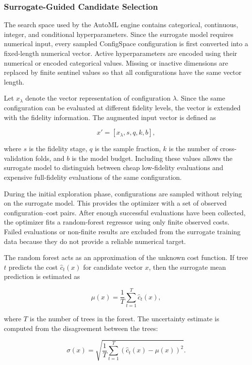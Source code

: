 \documentclass[12pt,a4paper]{report}
\begin{document}
\subsubsection{Surrogate-Guided Candidate Selection}

The search space used by the AutoML engine contains categorical,
continuous, integer, and conditional hyperparameters. Since the surrogate model
requires numerical input, every sampled ConfigSpace configuration is first
converted into a fixed-length numerical vector. Active hyperparameters are
encoded using their numerical or encoded categorical values. Missing or inactive
dimensions are replaced by finite sentinel values so that all configurations
have the same vector length.

\noindent Let \(x_{\lambda}\) denote the vector representation of configuration
\(\lambda\). Since the same configuration can be evaluated at different fidelity
levels, the vector is extended with the fidelity information. The augmented
input vector is defined as

\[
x' = [x_{\lambda}, s, q, k, b],
\]

\noindent where \(s\) is the fidelity stage, \(q\) is the sample fraction, \(k\) is the
number of cross-validation folds, and \(b\) is the model budget. Including these
values allows the surrogate model to distinguish between cheap low-fidelity
evaluations and expensive full-fidelity evaluations of the same configuration.

\noindent During the initial exploration phase, configurations are sampled without relying
on the surrogate model. This provides the optimizer with a set of observed
configuration--cost pairs. After enough successful evaluations have been
collected, the optimizer fits a random-forest regressor using only finite
observed costs. Failed evaluations or non-finite results are excluded from the
surrogate training data because they do not provide a reliable numerical target.

\noindent The random forest acts as an approximation of the unknown cost function. If
tree \(t\) predicts the cost \(\hat{c}_t(x)\) for candidate vector \(x\), then
the surrogate mean prediction is estimated as

\[
\mu(x) =
\frac{1}{T}
\sum_{t=1}^{T}
\hat{c}_t(x),
\]

\noindent where \(T\) is the number of trees in the forest. The uncertainty estimate is
computed from the disagreement between the trees:

\[
\sigma(x) =
\sqrt{
\frac{1}{T}
\sum_{t=1}^{T}
\left(
\hat{c}_t(x) - \mu(x)
\right)^2
}.
\]
\end{document}
